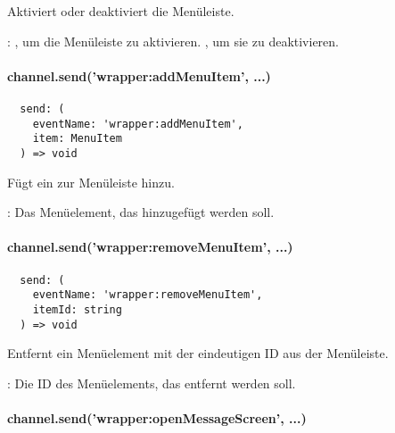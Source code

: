 Aktiviert oder deaktiviert die Menüleiste.

\begin{arguments}
  \item {}: , um die Menüleiste zu aktivieren. , um sie zu deaktivieren.
\end{arguments}


\paragraph{channel.send('wrapper:addMenuItem', ...)}

\begin{verbatim}
  send: (
    eventName: 'wrapper:addMenuItem',
    item: MenuItem
  ) => void
\end{verbatim}

Fügt ein  zur Menüleiste hinzu.

\begin{arguments}
  \item {}: Das Menüelement, das hinzugefügt werden soll.
\end{arguments}


\paragraph{channel.send('wrapper:removeMenuItem', ...)}

\begin{verbatim}
  send: (
    eventName: 'wrapper:removeMenuItem',
    itemId: string
  ) => void
\end{verbatim}

Entfernt ein Menüelement mit der eindeutigen ID  aus der Menüleiste.

\begin{arguments}
  \item {}: Die ID des Menüelements, das entfernt werden soll.
\end{arguments}


\newpage

\paragraph{channel.send('wrapper:openMessageScreen', ...)}

